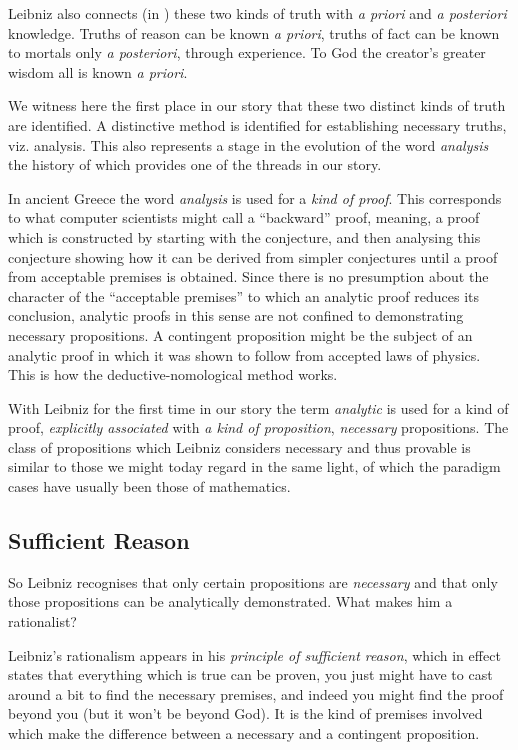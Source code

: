 Leibniz also connects (in \cite{leibnizNCT}) these two kinds of truth with {\it a priori} and {\it a posteriori} knowledge.
Truths of reason can be known {\it a priori}, truths of fact can be known to mortals only {\it a posteriori}, through experience.
To God the creator's greater wisdom all is known {\it a priori}.

We witness here the first place in our story that these two distinct kinds of truth are identified.
A distinctive method is identified for establishing necessary truths, viz. analysis.
This also represents a stage in the evolution of the word {\it analysis} the history of which provides one of the threads in our story.

In ancient Greece the word {\it analysis} is used for a {\it kind of proof}.
This corresponds to what computer scientists might call a ``backward'' proof, meaning, a proof which is constructed by starting with the conjecture, and then analysing this conjecture showing how it can be derived from simpler conjectures until a proof from acceptable premises is obtained.
Since there is no presumption about the character of the ``acceptable premises'' to which an analytic proof reduces its conclusion, analytic proofs in this sense are not confined to demonstrating necessary propositions.
A contingent proposition might be the subject of an analytic proof in which it was shown to follow from accepted laws of physics.
This is how the deductive-nomological method works.

With Leibniz for the first time in our story the term {\it analytic} is used for a kind of proof, {\it explicitly associated} with {\it a kind of proposition}, {\it necessary} propositions.
The class of propositions which Leibniz considers necessary and thus provable is similar to those we might today regard in the same light, of which the paradigm cases have usually been those of mathematics.


\subsection{Sufficient Reason}

So Leibniz recognises that only certain propositions are {\it necessary} and that only those propositions can be analytically demonstrated.
What makes him a rationalist?

Leibniz's rationalism appears in his {\it principle of sufficient reason}, which in effect states that everything which is true can be proven, you just might have to cast around a bit to find the necessary premises, and indeed you might find the proof beyond you (but it won't be beyond God).
It is the kind of premises involved which make the difference between a necessary and a contingent proposition.

